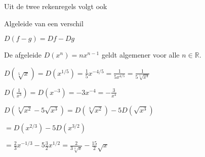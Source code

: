 \documentclass{article}
\begin{document}
Uit de twee rekenregels volgt ook
\begin{eigenschap} Algeleide van een verschil

$\boxed {D(f-g)=Df-Dg}$
\end{eigenschap}\vspace{5 mm}
\begin{eigenschap}
De afgeleide $D(x^n)=nx^{n-1}$ geldt algemener voor alle $n\in \mathbb{R}$.
\end{eigenschap}

\begin{voorbeeld}
$D(\sqrt[5]{x})=D(x^{1/5})=\frac{1}{5}x^{-4/5}=\frac{1}{5x^{4/5}}=\frac{1}{5\sqrt[5]{x^4}}$
\end{voorbeeld}

\begin{voorbeeld}
$D(\frac{1}{x^3})=D(x^{-3})=-3x^{-4}=-\frac{3}{x^4}$
\end{voorbeeld}

\begin{voorbeeld}
$D(\sqrt[3]{x^2}-5\sqrt{x^3})=D(\sqrt[3]{x^2})-5D(\sqrt{x^3})$

\hspace{5mm} $=D(x^{2/3})-5D(x^{3/2})$

\hspace{5mm} $=\frac{2}{3}x^{-1/3}-5\frac{3}{2}x^{1/2}=\frac{2}{3\sqrt[3]{x}}-\frac{15}{2}\sqrt{x}$
\end{voorbeeld}
\end{document}
